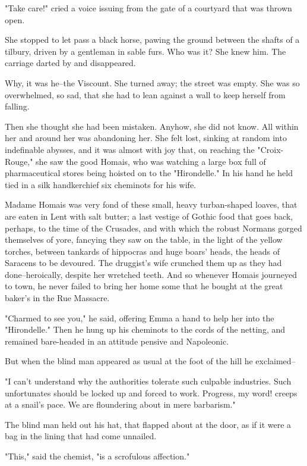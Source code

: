 \documentclass[11pt,twocolumn]{ltugboat}
\begin{document}
"Take care!" cried a voice issuing from the gate of a courtyard that was
thrown open.

She stopped to let pass a black horse, pawing the ground between the
shafts of a tilbury, driven by a gentleman in sable furs. Who was it?
She knew him. The carriage darted by and disappeared.

Why, it was he--the Viscount. She turned away; the street was empty. She
was so overwhelmed, so sad, that she had to lean against a wall to keep
herself from falling.

Then she thought she had been mistaken. Anyhow, she did not know. All
within her and around her was abandoning her. She felt lost, sinking
at random into indefinable abysses, and it was almost with joy that, on
reaching the "Croix-Rouge," she saw the good Homais, who was watching
a large box full of pharmaceutical stores being hoisted on to the
"Hirondelle." In his hand he held tied in a silk handkerchief six
cheminots for his wife.

Madame Homais was very fond of these small, heavy turban-shaped loaves,
that are eaten in Lent with salt butter; a last vestige of Gothic food
that goes back, perhaps, to the time of the Crusades, and with which
the robust Normans gorged themselves of yore, fancying they saw on the
table, in the light of the yellow torches, between tankards of hippocras
and huge boars' heads, the heads of Saracens to be devoured. The
druggist's wife crunched them up as they had done--heroically, despite
her wretched teeth. And so whenever Homais journeyed to town, he never
failed to bring her home some that he bought at the great baker's in the
Rue Massacre.

"Charmed to see you," he said, offering Emma a hand to help her into the
"Hirondelle." Then he hung up his cheminots to the cords of the netting,
and remained bare-headed in an attitude pensive and Napoleonic.

But when the blind man appeared as usual at the foot of the hill he
exclaimed--

"I can't understand why the authorities tolerate such culpable
industries. Such unfortunates should be locked up and forced to work.
Progress, my word! creeps at a snail's pace. We are floundering about in
mere barbarism."

The blind man held out his hat, that flapped about at the door, as if it
were a bag in the lining that had come unnailed.

"This," said the chemist, "is a scrofulous affection."
\end{document}
